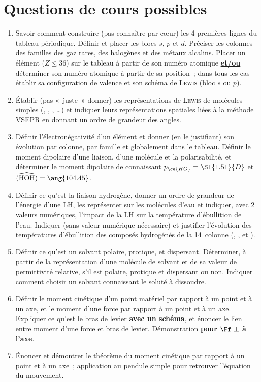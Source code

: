 \documentclass[a4paper, 12pt, final, garamond]{book}
\begin{document}
\section{Questions de cours possibles}
\begin{enumerate}[label=\sqenumi]
    \item Savoir comment construire (pas connaître par cœur) les 4 premières
        lignes du tableau périodique. Définir et placer les blocs $s$, $p$ et
        $d$. Préciser les colonnes des familles des gaz rares, des halogènes et
        des métaux alcalins. Placer un élément ($Z \leq 36$) sur le tableau à
        partir de son numéro atomique \textbf{\ul{et/ou}} déterminer son numéro
        atomique à partir de sa position~; dans tous les cas établir sa
        configuration de valence et son schéma de \textsc{Lewis} (bloc $s$ ou
        $p$).
    \item Établir (pas «~juste~» donner) les représentations de \textsc{Lewis}
        de molécules simples (, , , …) et
        indiquer leurs représentations spatiales liées à la méthode VSEPR en
        donnant un ordre de grandeur des angles.
    \item Définir l'électronégativité d'un élément et donner (en le justifiant)
        son évolution par colonne, par famille et globalement dans le tableau.
        Définir le moment dipolaire d'une liaison, d'une molécule et la
        polarisabilité, et déterminer le moment dipolaire de 
        connaissant $p_{\ce{HO}} = \SI{1.51}{D}$ et $\widehat{({\rm HOH})} =
        \ang{104.45}$.
    \item Définir ce qu'est la liaison hydrogène, donner un ordre de grandeur de
        l'énergie d'une LH, les représenter sur les molécules d'eau et indiquer,
        avec 2 valeurs numériques, l'impact de la LH sur la température
        d'ébullition de l'eau. Indiquer (sans valeur numérique nécessaire) et
        justifier l'évolution des températures d'ébullition des composés
        hydrogénés de la 14\ieme\ colonne (, ,  et
        ).
    \item Définir ce qu'est un solvant polaire, protique, et dispersant.
        Déterminer, à partir de la représentation d'une molécule de solvant et
        de sa valeur de permittivité relative, s'il est polaire, protique et
        dispersant ou non. Indiquer comment choisir un solvant connaissant le
        soluté à dissoudre.

    \item Définir le moment cinétique d'un point matériel par rapport à un point
        et à un axe, et le moment d'une force par rapport à un point et à un
        axe. Expliquer ce qu'est le bras de levier \textbf{avec un schéma}, et
        énoncer le lien entre moment d'une force et bras de levier.
        Démonstration \textbf{pour $\Ff \perp$ à l'axe}.
    \item Énoncer et démontrer le théorème du moment cinétique par rapport à un
        point et à un axe~; application au pendule simple pour retrouver
        l'équation du mouvement.


\end{enumerate}
\end{document}
